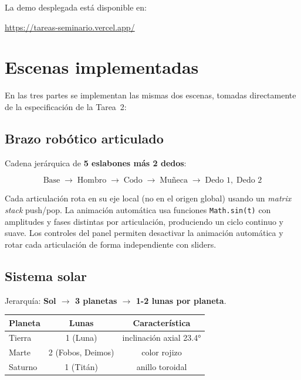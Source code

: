 \documentclass[12pt,a4paper]{article}
\begin{document}
La demo desplegada está disponible en:

\begin{center}
  \url{https://tareas-seminario.vercel.app/}
\end{center}

\section{Escenas implementadas}

En las tres partes se implementan las mismas dos escenas, tomadas directamente de la especificación de la Tarea~2:

\subsection{Brazo robótico articulado}

Cadena jerárquica de \textbf{5 eslabones más 2 dedos}:


\[
  \text{Base} \;\to\; \text{Hombro} \;\to\; \text{Codo} \;\to\; \text{Mu\~{n}eca} \;\to\; \text{Dedo 1},\; \text{Dedo 2}
\]


Cada articulación rota en su eje local (no en el origen global) usando un \textit{matrix stack} push/pop. La animación automática usa funciones \texttt{Math.sin(t)} con amplitudes y fases distintas por articulación, produciendo un ciclo continuo y suave. Los controles del panel permiten desactivar la animación automática y rotar cada articulación de forma independiente con sliders.

\subsection{Sistema solar}

Jerarquía: \textbf{Sol $\to$ 3 planetas $\to$ 1-2 lunas por planeta}.

\begin{center}
\begin{tabular}{lcc}
  \toprule
  Planeta & Lunas & Característica \\
  \midrule
  Tierra  & 1 (Luna)           & inclinación axial 23.4° \\
  Marte   & 2 (Fobos, Deimos)  & color rojizo             \\
  Saturno & 1 (Titán)          & anillo toroidal          \\
  \bottomrule
\end{tabular}
\end{center}
\end{document}
